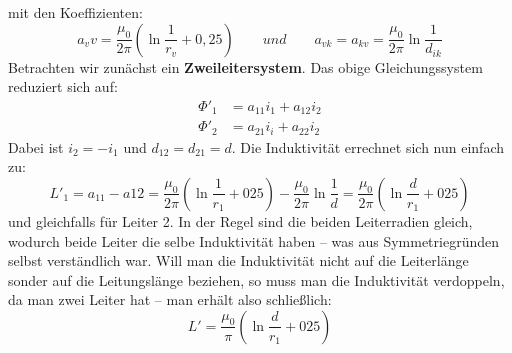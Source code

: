 mit den Koeffizienten:
\begin{equation}
a_vv = \frac{\mu_0}{2\pi} \left( \ln\frac{1}{r_v} + 0,25 \right) \qquad und \qquad a_{vk} = a_{kv} = \frac{\mu_0}{2\pi} \ln\frac{1}{d_{ik}}
\end{equation}
Betrachten wir zunächst ein \textbf{Zweileitersystem}. Das obige Gleichungssystem reduziert sich auf:
\begin{align}
\Phi'_1 &= a_{11}i_1 + a_{12}i_2 \\
\Phi'_2 &= a_{21}i_i + a_{22}i_2
\end{align}
Dabei ist $i_2 = -i_1$ und $d_{12} = d_{21} = d$. Die Induktivität errechnet sich nun einfach zu:
\begin{equation}
L'_1 = a_{11} - a{12} = \frac{\mu_0}{2\pi}\left(\ln\frac{1}{r_1}+025\right)-\frac{\mu_0}{2\pi}\ln\frac{1}{d} = 
\frac{\mu_0}{2\pi}\left(\ln\frac{d}{r_1}+025\right)
\end{equation}
und gleichfalls für Leiter 2. In der Regel sind die beiden Leiterradien gleich, wodurch beide Leiter die selbe Induktivität haben – was aus Symmetriegründen selbst verständlich war. Will man die Induktivität nicht auf die Leiterlänge sonder auf die Leitungslänge beziehen, so muss man die Induktivität verdoppeln, da man zwei Leiter hat – man erhält also schließlich:
\begin{equation}
L' = \frac{\mu_0}{\pi}\left(\ln\frac{d}{r_1}+025\right)
\end{equation}

